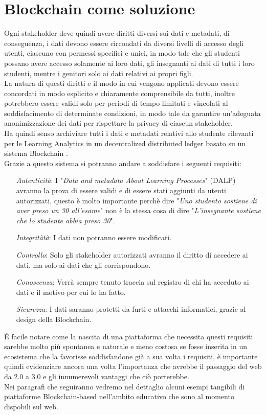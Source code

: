 \section{Blockchain come soluzione}
Ogni stakeholder deve quindi avere diritti diversi sui dati e metadati, 
di conseguenza, i dati devono essere circondati da diversi livelli di accesso degli utenti, ciascuno con permessi specifici e unici,
in modo tale che gli studenti possano avere accesso solamente ai loro dati, gli insegnanti ai dati di tutti i loro studenti, mentre i genitori solo ai dati relativi ai propri figli.
\\La natura di questi diritti e il modo in cui vengono applicati devono essere concordati in modo esplicito e chiaramente comprensibile da tutti, 
inoltre potrebbero essere validi solo per periodi di tempo limitati e vincolati al soddisfacimento di determinate condizioni, in modo tale da garantire un'adeguata anonimizzazione dei dati per rispettare la privacy di ciascun stakeholder.
\\Ha quindi senso archiviare tutti i dati e metadati relativi allo studente rilevanti per le Learning Analytics in un decentralized distributed ledger basato su un sistema Blockchain \cite{Learning_Analytics_Privacy_on_the_Blockchain}.
\\Grazie a questo sistema si potranno andare a soddisfare i seguenti requisiti:
\begin{itemize}
    \item[\textit{Autenticità}:] I "\textit{Data and metadata About Learning Processes}" (DALP) avranno la prova di essere validi e di essere stati aggiunti da utenti autorizzati, questo è molto importante perchè dire "\textit{Uno studento sostiene di aver preso un 30 all'esame}" non è la stessa cosa di dire "\textit{L'insegnante sostiene che lo studente abbia preso 30}".
    \item[\textit{Integritàtà}:] I dati non potranno essere modificati.
    \item[\textit{Controllo}:] Solo gli stakeholder autorizzati avranno il diritto di accedere ai dati, ma solo ai dati che gli corrispondono. 
    \item[\textit{Conoscenza}:] Verrà sempre tenuto traccia sul registro di chi ha acceduto ai dati e il motivo per cui lo ha fatto.
    \item[\textit{Sicurezza}:] I dati saranno protetti da furti e attacchi informatici, grazie al design della Blockchain.
\end{itemize}
\'E facile notare come la nascita di una piattaforma che necessita questi requisiti sarebbe molto più spontanea e naturale e meno costosa se 
fosse inserita in un ecosistema che la favorisse soddisfandone già a sua volta i requisiti, è importante quindi evidenziare ancora una volta
l'importanza che avrebbe il passaggio del web da 2.0 a 3.0 e gli innumerevoli vantaggi che ciò porterebbe.
\\Nei paragrafi che seguiranno vedremo nel dettaglio alcuni esempi tangibili di piattaforme Blockchain-based nell'ambito educativo che sono al momento dispobili sul web.

